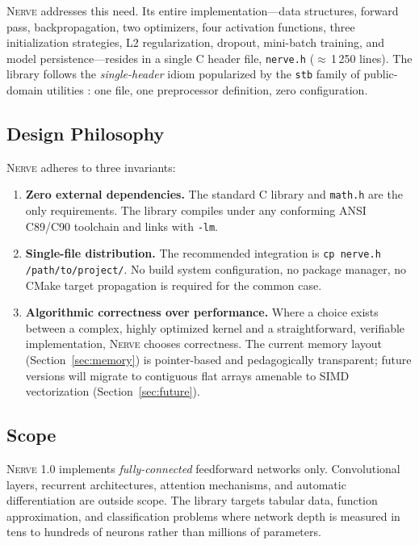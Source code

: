 \documentclass[11pt,a4paper]{article}
\newcommand{\nerve}{\textsc{Nerve}}
\begin{document}
\nerve{} addresses this need. Its entire implementation---data structures,
forward pass, backpropagation, two optimizers, four activation functions, three
initialization strategies, L2 regularization, dropout, mini-batch training, and
model persistence---resides in a single C header file, \texttt{nerve.h}
($\approx$\,1\,250 lines). The library follows the \emph{single-header}
idiom popularized by the \texttt{stb} family of public-domain utilities
\cite{barrett_stb}: one file, one preprocessor definition, zero configuration.

\subsection{Design Philosophy}

\nerve{} adheres to three invariants:

\begin{enumerate}[leftmargin=2.4em]
  \item \textbf{Zero external dependencies.} The standard C library and
    \texttt{math.h} are the only requirements. The library compiles under any
    conforming ANSI C89/C90 toolchain and links with \texttt{-lm}.
  \item \textbf{Single-file distribution.} The recommended integration is
    \texttt{cp nerve.h /path/to/project/}. No build system configuration,
    no package manager, no CMake target propagation is required for the
    common case.
  \item \textbf{Algorithmic correctness over performance.} Where a choice
    exists between a complex, highly optimized kernel and a straightforward,
    verifiable implementation, \nerve{} chooses correctness. The current
    memory layout (Section~\ref{sec:memory}) is pointer-based and
    pedagogically transparent; future versions will migrate to contiguous
    flat arrays amenable to SIMD vectorization (Section~\ref{sec:future}).
\end{enumerate}

\subsection{Scope}

\nerve{} 1.0 implements \emph{fully-connected} feedforward networks only.
Convolutional layers, recurrent architectures, attention mechanisms, and
automatic differentiation are outside scope. The library targets tabular
data, function approximation, and classification problems where network
depth is measured in tens to hundreds of neurons rather than millions of
parameters.
\end{document}
